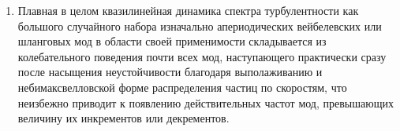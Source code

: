 \begin{enumerate}
    \item Плавная в целом квазилинейная динамика спектра турбулентности как большого случайного набора изначально апериодических вейбелевских или шланговых мод в области своей применимости складывается из колебательного поведения почти всех мод, наступающего практически сразу после насыщения неустойчивости благодаря выполаживанию и небимаксвелловской форме распределения частиц по скоростям, что неизбежно приводит к появлению действительных частот мод, превышающих величину их инкрементов или декрементов. 


\end{enumerate}
